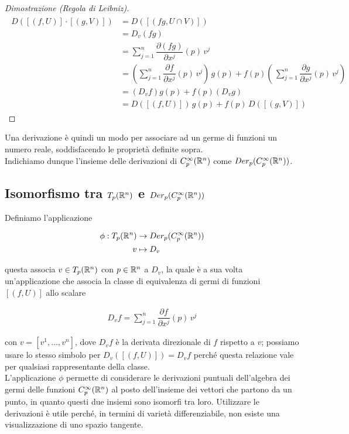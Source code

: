 \begin{proof}[Dimostrazione (Regola di Leibniz)]
	\begin{align}
		\begin{split}
			D ([(f,U)] \cdot [(g,V)]) &= D ([(f g,U \cap V)])\\
			&= D_{v} (f g)\\
			&= \sum_{j=1}^{n} \dfrac{\partial (f g)}{\partial x^{j}} (p) \, v^{j}\\
			&= \left( \sum_{j=1}^{n} \dfrac{\partial f}{\partial x^{j}} (p) \, v^{j} \right) \, g(p) + f(p) \left( \, \sum_{j=1}^{n} \dfrac{\partial g}{\partial x^{j}} (p) \, v^{j} \right)\\
			&= (D_{v} f) g(p) + f(p) (D_{v} g)\\
			&= D ([(f,U)]) \, g(p) + f(p) \, D ([(g,V)])
		\end{split}
	\end{align}
\end{proof}

Una derivazione è quindi un modo per associare ad un germe di funzioni un numero reale, soddisfacendo le proprietà definite sopra.\\
Indichiamo dunque l'insieme delle derivazioni di $ C_{p}^{\infty}(\mathbb{R}^{n}) $ come $ Der_{p}(C_{p}^{\infty}(\mathbb{R}^{n})) $.

\subsection{Isomorfismo tra $ T_{p}(\mathbb{R}^{n}) $ e $ Der_{p}(C_{p}^{\infty}(\mathbb{R}^{n})) $}

Definiamo l'applicazione

\begin{align}
	\begin{split}
		\phi : T_{p}(\mathbb{R}^{n}) &\to Der_{p}(C_{p}^{\infty}(\mathbb{R}^{n}))\\
		v &\mapsto D_{v}
	\end{split}
\end{align}

questa associa $ v \in T_{p}(\mathbb{R}^{n}) $ con $ p \in \mathbb{R}^{n} $ a $ D_{v} $, la quale è a sua volta un'applicazione che associa la classe di equivalenza di germi di funzioni $ [(f,U)] $ allo scalare

\begin{align}
	D_{v} f = \sum_{j=1}^{n} \dfrac{\partial f}{\partial x^{j}} (p) \, v^{j}
\end{align}

con $ v = [v^{1},\dots,v^{n}] $, dove $ D_{v} f $ è la derivata direzionale di $ f $ rispetto a $ v $; possiamo usare lo stesso simbolo per $ D_{v} ([(f,U)]) = D_{v} f $ perché questa relazione vale per qualsiasi rappresentante della classe.\\
L'applicazione $ \phi $ permette di considerare le derivazioni puntuali dell'algebra dei germi delle funzioni $ C_{p}^{\infty}(\mathbb{R}^{n}) $ al posto dell'insieme dei vettori che partono da un punto, in quanto questi due insiemi sono isomorfi tra loro. Utilizzare le derivazioni è utile perché, in termini di varietà differenziabile, non esiste una visualizzazione di uno spazio tangente.

